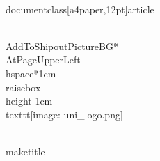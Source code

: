 \\documentclass[a4paper,12pt]{article}
\begin{document}
\\AddToShipoutPictureBG*{%
  \\AtPageUpperLeft{%
    \\hspace*{1cm}%
    \\raisebox{-\\height-1cm}{%
      \\texttt{[image: uni\_logo.png]}%
    }%
  }%
}

\\maketitle

\
\end{document}
